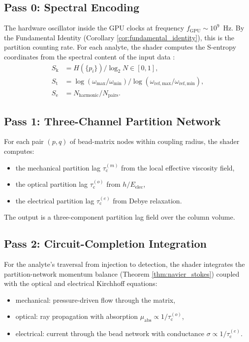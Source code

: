 \documentclass[twocolumn,10pt,a4paper]{article}
\theoremstyle{definition}
\theoremstyle{remark}
\newcommand{\tauM}{\tau_{\mathrm{c}}^{(m)}}
\newcommand{\tauO}{\tau_{\mathrm{c}}^{(o)}}
\newcommand{\tauE}{\tau_{\mathrm{c}}^{(e)}}
\newcommand{\Sk}{S_{\mathrm{k}}}
\newcommand{\St}{S_{\mathrm{t}}}
\newcommand{\Se}{S_{\mathrm{e}}}
\begin{document}
\subsection{Pass 0: Spectral Encoding}

The hardware oscillator inside the GPU clocks at frequency $f_{\mathrm{GPU}} \sim 10^9$~Hz. By the Fundamental Identity (Corollary \ref{cor:fundamental_identity}), this is the partition counting rate. For each analyte, the shader computes the S-entropy coordinates from the spectral content of the input data \citep{shannon1948}:
\begin{align}
\Sk &= H(\{p_i\}) / \log_2 N \in [0,1],\\
\St &= \log(\omega_{\max}/\omega_{\min}) / \log(\omega_{\mathrm{ref,max}}/\omega_{\mathrm{ref,min}}),\\
\Se &= N_{\mathrm{harmonic}} / N_{\mathrm{pairs}}.
\end{align}

\subsection{Pass 1: Three-Channel Partition Network}

For each pair $(p, q)$ of bead-matrix nodes within coupling radius, the shader computes:
\begin{itemize}[leftmargin=1.2em,nosep]
\item the mechanical partition lag $\tauM$ from the local effective viscosity field,
\item the optical partition lag $\tauO$ from $h/E_{\mathrm{elec}}$,
\item the electrical partition lag $\tauE$ from Debye relaxation.
\end{itemize}

The output is a three-component partition lag field over the column volume.

\subsection{Pass 2: Circuit-Completion Integration}

For the analyte's traversal from injection to detection, the shader integrates the partition-network momentum balance (Theorem \ref{thm:navier_stokes}) coupled with the optical and electrical Kirchhoff equations:
\begin{itemize}[leftmargin=1.2em,nosep]
\item mechanical: pressure-driven flow through the matrix,
\item optical: ray propagation with absorption $\mu_{\mathrm{abs}} \propto 1/\tauO$,
\item electrical: current through the bead network with conductance $\sigma \propto 1/\tauE$.
\end{itemize}
\end{document}
